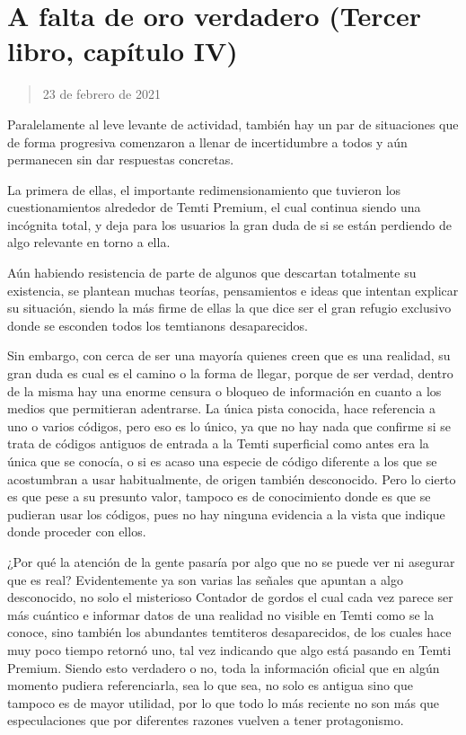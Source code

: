 \documentclass[
]{book}
\begin{document}
\hypertarget{a-falta-de-oro-verdadero-tercer-libro-capuxedtulo-iv}{%
\section{A falta de oro verdadero (Tercer libro, capítulo IV)}\label{a-falta-de-oro-verdadero-tercer-libro-capuxedtulo-iv}}

\begin{quote}
23 de febrero de 2021
\end{quote}

Paralelamente al leve levante de actividad, también hay un par de situaciones que de forma progresiva comenzaron a llenar de incertidumbre a todos y aún permanecen sin dar respuestas concretas.

La primera de ellas, el importante redimensionamiento que tuvieron los cuestionamientos alrededor de Temti Premium, el cual continua siendo una incógnita total, y deja para los usuarios la gran duda de si se están perdiendo de algo relevante en torno a ella.

Aún habiendo resistencia de parte de algunos que descartan totalmente su existencia, se plantean muchas teorías, pensamientos e ideas que intentan explicar su situación, siendo la más firme de ellas la que dice ser el gran refugio exclusivo donde se esconden todos los temtianons desaparecidos.

Sin embargo, con cerca de ser una mayoría quienes creen que es una realidad, su gran duda es cual es el camino o la forma de llegar, porque de ser verdad, dentro de la misma hay una enorme censura o bloqueo de información en cuanto a los medios que permitieran adentrarse. La única pista conocida, hace referencia a uno o varios códigos, pero eso es lo único, ya que no hay nada que confirme si se trata de códigos antiguos de entrada a la Temti superficial como antes era la única que se conocía, o si es acaso una especie de código diferente a los que se acostumbran a usar habitualmente, de origen también desconocido. Pero lo cierto es que pese a su presunto valor, tampoco es de conocimiento donde es que se pudieran usar los códigos, pues no hay ninguna evidencia a la vista que indique donde proceder con ellos.

¿Por qué la atención de la gente pasaría por algo que no se puede ver ni asegurar que es real? Evidentemente ya son varias las señales que apuntan a algo desconocido, no solo el misterioso Contador de gordos el cual cada vez parece ser más cuántico e informar datos de una realidad no visible en Temti como se la conoce, sino también los abundantes temtiteros desaparecidos, de los cuales hace muy poco tiempo retornó uno, tal vez indicando que algo está pasando en Temti Premium. Siendo esto verdadero o no, toda la información oficial que en algún momento pudiera referenciarla, sea lo que sea, no solo es antigua sino que tampoco es de mayor utilidad, por lo que todo lo más reciente no son más que especulaciones que por diferentes razones vuelven a tener protagonismo.
\end{document}
